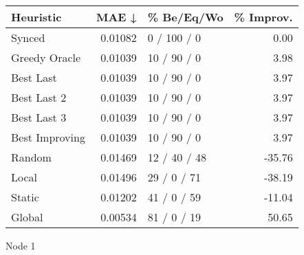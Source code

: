 \begin{tabular}{lrlr}
\toprule
\textbf{Heuristic} & \textbf{MAE ↓} & \textbf{\% Be/Eq/Wo} & \textbf{\% Improv.} \\
\midrule
            Synced &        0.01082 &          0 / 100 / 0 &                0.00 \\
     Greedy Oracle &        0.01039 &          10 / 90 / 0 &                3.98 \\
         Best Last &        0.01039 &          10 / 90 / 0 &                3.97 \\
       Best Last 2 &        0.01039 &          10 / 90 / 0 &                3.97 \\
       Best Last 3 &        0.01039 &          10 / 90 / 0 &                3.97 \\
    Best Improving &        0.01039 &          10 / 90 / 0 &                3.97 \\
            Random &        0.01469 &         12 / 40 / 48 &              -35.76 \\
             Local &        0.01496 &          29 / 0 / 71 &              -38.19 \\
            Static &        0.01202 &          41 / 0 / 59 &              -11.04 \\
            Global &        0.00534 &          81 / 0 / 19 &               50.65 \\
\bottomrule
\end{tabular}
\caption{Node 1}
\label{tab:non_lr05_le1_bs2_1}
